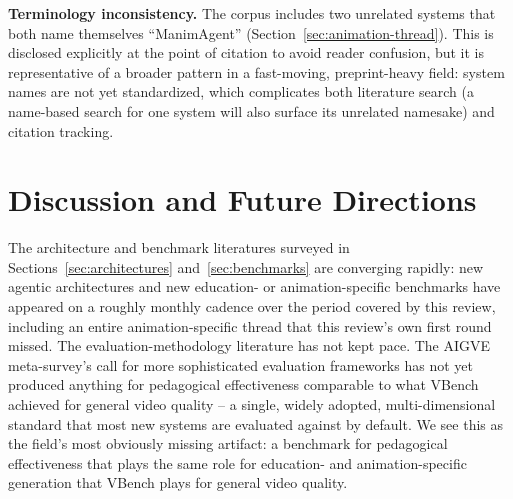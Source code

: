 \documentclass[journal]{IEEEtran}
\begin{document}
\textbf{Terminology inconsistency.} The corpus includes two unrelated systems that both name themselves ``ManimAgent'' (Section~\ref{sec:animation-thread}). This is disclosed explicitly at the point of citation to avoid reader confusion, but it is representative of a broader pattern in a fast-moving, preprint-heavy field: system names are not yet standardized, which complicates both literature search (a name-based search for one system will also surface its unrelated namesake) and citation tracking.

\section{Discussion and Future Directions}
\label{sec:discussion}

The architecture and benchmark literatures surveyed in Sections~\ref{sec:architectures} and~\ref{sec:benchmarks} are converging rapidly: new agentic architectures and new education- or animation-specific benchmarks have appeared on a roughly monthly cadence over the period covered by this review, including an entire animation-specific thread that this review's own first round missed. The evaluation-methodology literature has not kept pace. The AIGVE meta-survey's call for more sophisticated evaluation frameworks \cite{liu2024aigve} has not yet produced anything for pedagogical effectiveness comparable to what VBench achieved for general video quality \cite{huang2024vbench} -- a single, widely adopted, multi-dimensional standard that most new systems are evaluated against by default. We see this as the field's most obviously missing artifact: a benchmark for pedagogical effectiveness that plays the same role for education- and animation-specific generation that VBench plays for general video quality.
\end{document}
